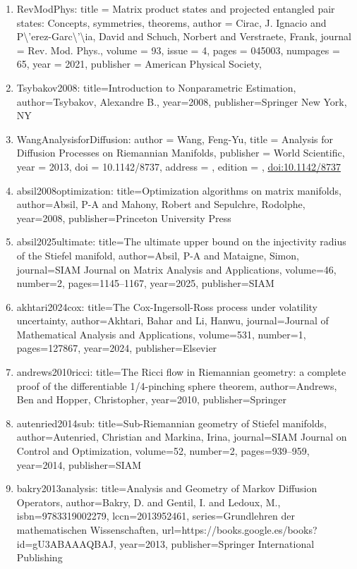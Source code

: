 \documentclass[11pt]{article}
\begin{document}
\begin{enumerate}[leftmargin=*]
  \item RevModPhys: title = Matrix product states and projected entangled pair states: Concepts, symmetries, theorems, author = Cirac, J. Ignacio and P\textbackslash{}'erez-Garc\textbackslash{}'\textbackslash{}ia, David and Schuch, Norbert and Verstraete, Frank, journal = Rev. Mod. Phys., volume = 93, issue = 4, pages = 045003, numpages = 65, year = 2021, publisher = American Physical Society,
  \item Tsybakov2008: title=Introduction to Nonparametric Estimation, author=Tsybakov, Alexandre B., year=2008, publisher=Springer New York, NY
  \item WangAnalysisforDiffusion: author = Wang, Feng-Yu, title = Analysis for Diffusion Processes on Riemannian Manifolds, publisher = World Scientific, year = 2013, doi = 10.1142/8737, address = , edition = , \href{https://doi.org/10.1142/8737}{doi:10.1142/8737}
  \item absil2008optimization: title=Optimization algorithms on matrix manifolds, author=Absil, P-A and Mahony, Robert and Sepulchre, Rodolphe, year=2008, publisher=Princeton University Press
  \item absil2025ultimate: title=The ultimate upper bound on the injectivity radius of the Stiefel manifold, author=Absil, P-A and Mataigne, Simon, journal=SIAM Journal on Matrix Analysis and Applications, volume=46, number=2, pages=1145--1167, year=2025, publisher=SIAM
  \item akhtari2024cox: title=The Cox-Ingersoll-Ross process under volatility uncertainty, author=Akhtari, Bahar and Li, Hanwu, journal=Journal of Mathematical Analysis and Applications, volume=531, number=1, pages=127867, year=2024, publisher=Elsevier
  \item andrews2010ricci: title=The Ricci flow in Riemannian geometry: a complete proof of the differentiable 1/4-pinching sphere theorem, author=Andrews, Ben and Hopper, Christopher, year=2010, publisher=Springer
  \item autenried2014sub: title=Sub-Riemannian geometry of Stiefel manifolds, author=Autenried, Christian and Markina, Irina, journal=SIAM Journal on Control and Optimization, volume=52, number=2, pages=939--959, year=2014, publisher=SIAM
  \item bakry2013analysis: title=Analysis and Geometry of Markov Diffusion Operators, author=Bakry, D. and Gentil, I. and Ledoux, M., isbn=9783319002279, lccn=2013952461, series=Grundlehren der mathematischen Wissenschaften, url=https://books.google.es/books?id=gU3ABAAAQBAJ, year=2013, publisher=Springer International Publishing

\end{enumerate}
\end{document}
